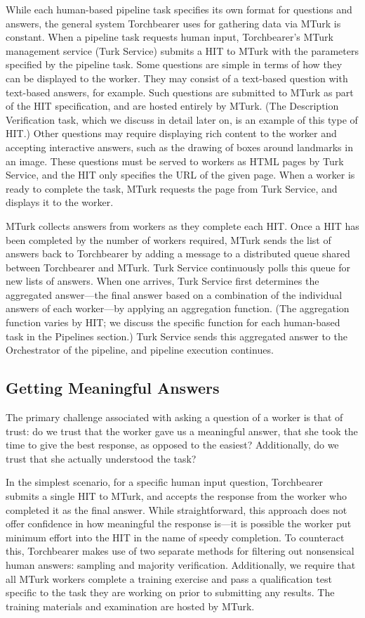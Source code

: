 While each human-based pipeline task specifies its own format for questions and answers, the general system Torchbearer uses for gathering data via MTurk is constant. When a pipeline task requests human input, Torchbearer's MTurk management service (Turk Service) submits a HIT to MTurk with the parameters specified by the pipeline task. Some questions are simple in terms of how they can be displayed to the worker. They may consist of a text-based question with text-based answers, for example. Such questions are submitted to MTurk as part of the HIT specification, and are hosted entirely by MTurk. (The Description Verification task, which we discuss in detail later on, is an example of this type of HIT.) Other questions may require displaying rich content to the worker and accepting interactive answers, such as the drawing of boxes around landmarks in an image. These questions must be served to workers as HTML pages by Turk Service, and the HIT only specifies the URL of the given page. When a worker is ready to complete the task, MTurk requests the page from Turk Service, and displays it to the worker.

MTurk collects answers from workers as they complete each HIT. Once a HIT has been completed by the number of workers required, MTurk sends the list of answers back to Torchbearer by adding a message to a distributed queue shared between Torchbearer and MTurk. Turk Service continuously polls this queue for new lists of answers. When one arrives, Turk Service first determines the aggregated answer---the final answer based on a combination of the individual answers of each worker---by applying an aggregation function. (The aggregation function varies by HIT; we discuss the specific function for each human-based task in the Pipelines section.) Turk Service sends this aggregated answer to the Orchestrator of the pipeline, and pipeline execution continues.

\subsection{Getting Meaningful Answers}

The primary challenge associated with asking a question of a worker is that of trust: do we trust that the worker gave us a meaningful answer, that she took the time to give the best response, as opposed to the easiest? Additionally, do we trust that she actually understood the task? 

In the simplest scenario, for a specific human input question, Torchbearer submits a single HIT to MTurk, and accepts the response from the worker who completed it as the final answer. While straightforward, this approach does not offer confidence in how meaningful the response is---it is possible the worker put minimum effort into the HIT in the name of speedy completion. To counteract this, Torchbearer makes use of two separate methods for filtering out nonsensical human answers: sampling and majority verification. Additionally, we require that all MTurk workers complete a training exercise and pass a qualification test specific to the task they are working on prior to submitting any results. The training materials and examination are hosted by MTurk.


